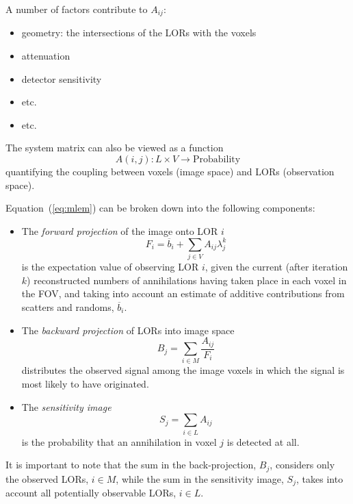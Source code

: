 \documentclass[10pt, a4paper, twocolumn]{article} %
\begin{document}
A number of factors contribute to \(A_{ij}\):
\begin{itemize}
  \item geometry: the intersections of the LORs with the voxels
  \item attenuation
  \item detector
  sensitivity
  \item etc.
  \item etc.
\end{itemize}

The system matrix can also be viewed as a function
\begin{equation}
  \label{eq:afun-discrete}
  A(i,j): L \times V \rightarrow \mathrm{Probability}
\end{equation}
quantifying the coupling between voxels (image space) and LORs
(observation space).

Equation~(\ref{eq:mlem}) can be broken down into the following components:
\begin{itemize}
  \item
  The \textit{forward projection} of the image onto LOR \(i\)
  \begin{equation}
  \label{eq:forward-project-discrete}
  F_{i} = \overline{b}_{i} + \sum_{j\in V}A_{ij}\lambda_{j}^{k}
  \end{equation}
    is the expectation value of observing LOR \(i\), given the current
    (after iteration \(k\)) reconstructed numbers of annihilations having
    taken place in each voxel in the FOV, and taking into account an
    estimate of additive contributions from scatters and randoms,
    \(\overline{b}_{i}\).
  \item
  The \textit{backward projection} of LORs into image space
  \begin{equation}
  \label{eq:back-project-discrete}
  B_{j} = \sum_{i\in M}\frac{A_{ij}}{F_{i}}
  \end{equation}
    distributes the observed signal among the image voxels in which the
    signal is most likely to have originated.
  \item
  The \textit{sensitivity image}
  \begin{equation}
  \label{eq:normalize-discrete}
  S_{j} = \sum_{i\in L}A_{ij}
  \end{equation}
  is the probability that an annihilation in voxel \(j\) is detected at all.
\end{itemize}
It is important to note that the sum in the back-projection, \(B_{j}\),
considers only the observed LORs, \(i\in M\), while the sum in the sensitivity
image, \(S_{j}\), takes into account all potentially observable LORs,
\(i\in L\).
\end{document}
